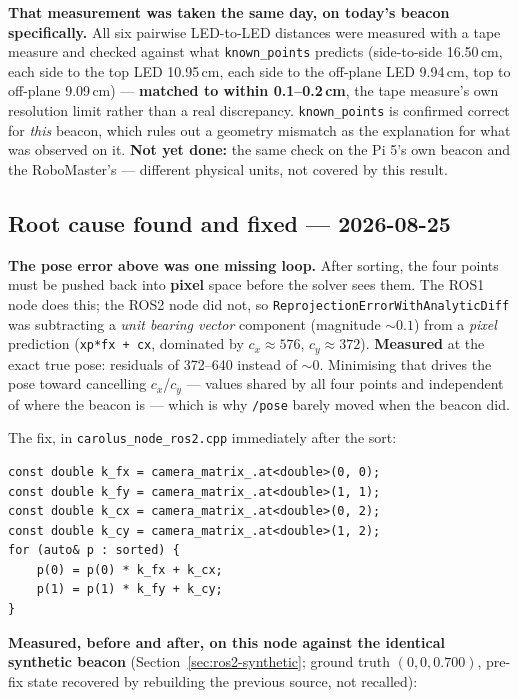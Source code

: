 \documentclass[11pt]{report}
\begin{document}
\textbf{That measurement was taken the same day, on today's beacon
specifically.} All six pairwise LED-to-LED distances were measured with a
tape measure and checked against what \texttt{known\_points} predicts
(side-to-side 16.50\,cm, each side to the top LED 10.95\,cm, each side to
the off-plane LED 9.94\,cm, top to off-plane 9.09\,cm) --- \textbf{matched
to within 0.1--0.2\,cm}, the tape measure's own resolution limit rather
than a real discrepancy. \texttt{known\_points} is confirmed correct for
\emph{this} beacon, which rules out a geometry mismatch as the explanation
for what was observed on it. \textbf{Not yet done:} the same check on the
Pi 5's own beacon and the RoboMaster's --- different physical units, not
covered by this result.

\subsection{Root cause found and fixed --- 2026-08-25}
\label{sec:bug132}

\textbf{The pose error above was one missing loop.} After sorting, the four
points must be pushed back into \textbf{pixel} space before the solver sees
them. The ROS1 node does this; the ROS2 node did not, so
\texttt{ReprojectionErrorWithAnalyticDiff} was subtracting a \emph{unit
bearing vector} component (magnitude ${\sim}0.1$) from a \emph{pixel}
prediction (\texttt{xp*fx + cx}, dominated by $c_x{\approx}576$,
$c_y{\approx}372$). \textbf{Measured} at the exact true pose: residuals of
372--640 instead of ${\sim}0$. Minimising that drives the pose toward
cancelling $c_x$/$c_y$ --- values shared by all four points and independent
of where the beacon is --- which is why \texttt{/pose} barely moved when the
beacon did.

The fix, in \texttt{carolus\_node\_ros2.cpp} immediately after the sort:

\begin{lstlisting}[style=code]
const double k_fx = camera_matrix_.at<double>(0, 0);
const double k_fy = camera_matrix_.at<double>(1, 1);
const double k_cx = camera_matrix_.at<double>(0, 2);
const double k_cy = camera_matrix_.at<double>(1, 2);
for (auto& p : sorted) {
    p(0) = p(0) * k_fx + k_cx;
    p(1) = p(1) * k_fy + k_cy;
}
\end{lstlisting}

\textbf{Measured, before and after, on this node against the identical
synthetic beacon} (Section~\ref{sec:ros2-synthetic}; ground truth
$(0,0,0.700)$, pre-fix state recovered by rebuilding the previous source,
not recalled):
\end{document}
